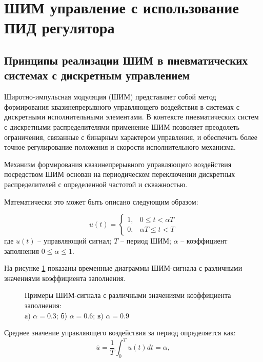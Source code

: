 \section{ШИМ управление с использование ПИД регулятора}\label{sec:ch3/sec2}

\subsection{Принципы реализации ШИМ в пневматических системах с дискретным управлением}\label{subsec:ch3/sec2/sub1}
Широтно-импульсная модуляция (ШИМ) представляет собой метод формирования квазинепрерывного
управляющего воздействия в системах с дискретными исполнительными элементами.
В контексте пневматических систем с дискретными распределителями применение ШИМ
позволяет преодолеть ограничения, связанные с бинарным характером управления, и обеспечить более
точное регулирование положения и скорости исполнительного механизма.

Механизм формирования квазинепрерывного управляющего воздействия
посредством ШИМ основан на периодическом переключении дискретных
распределителей с определенной частотой и скважностью.

Математически это может быть описано следующим образом:

\begin{equation}
	u(t) = \begin{cases}
		1, & 0 \leq t < \alpha T \\
		0, & \alpha T \leq t < T
	\end{cases}
\end{equation}
где $u(t)$ -- управляющий сигнал;
$T$ -- период ШИМ;
$\alpha$ -- коэффициент заполнения $0 \leq \alpha \leq 1$.

На рисунке \ref{fig:ch3:pwm_example} показаны временные диаграммы ШИМ-сигнала
с различными значениями коэффициента заполнения.

\begin{figure}[ht]
	\caption{Примеры ШИМ-сигнала с различными значениями коэффициента заполнения:\\ а) $\alpha = \num{0.3}$; б) $\alpha = \num{0.6}$; в) $\alpha = \num{0.9}$}
	\label{fig:ch3:pwm_example}
\end{figure}

Среднее значение управляющего воздействия за период определяется как:
\begin{equation}
	\bar{u} = \frac{1}{T} \int_0^T u(t) dt = \alpha,
\end{equation}


